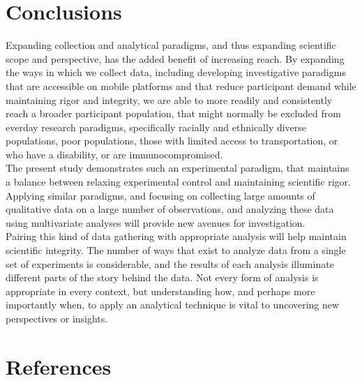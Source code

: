 \documentclass[
  english,
  man,floatsintext]{apa6}
\begin{document}
\hypertarget{conclusions}{%
\section{Conclusions}\label{conclusions}}

Expanding collection and analytical paradigms, and thus expanding scientific scope and perspective, has the added benefit of increasing reach. By expanding the ways in which we collect data, including developing investigative paradigms that are accessible on mobile platforms and that reduce participant demand while maintaining rigor and integrity, we are able to more readily and consistently reach a broader participant population, that might normally be excluded from everday research paradigms, specifically racially and ethnically diverse populations, poor populations, those with limited access to transportation, or who have a disability, or are immunocompromised.\\
The present study demonstrates such an experimental paradigm, that maintains a balance between relaxing experimental control and maintaining scientific rigor. Applying similar paradigms, and focusing on collecting large amounts of qualitative data on a large number of observations, and analyzing these data using multivariate analyses will provide new avenues for investigation.\\
Pairing this kind of data gathering with appropriate analysis will help maintain scientific integrity. The number of ways that exist to analyze data from a single set of experiments is considerable, and the results of each analysis illuminate different parts of the story behind the data. Not every form of analysis is appropriate in every context, but understanding how, and perhaps more importantly when, to apply an analytical technique is vital to uncovering new perspectives or insights.

\newpage

\hypertarget{references}{%
\section{References}\label{references}}

\begingroup
\setlength{\parindent}{-0.5in}
\setlength{\leftskip}{0.5in}
\end{document}
